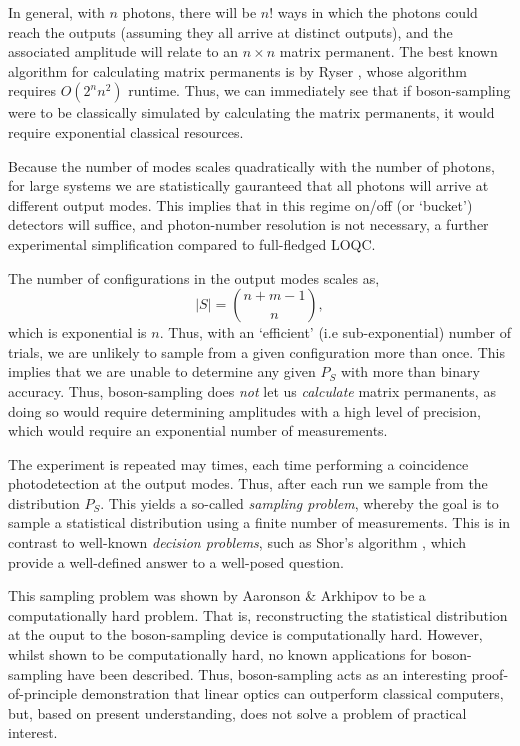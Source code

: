 \documentclass[aps,pra,twocolumn,amsmath,amssymb,nofootinbib,superscriptaddress]{revtex4}
\begin{document}
In general, with $n$ photons, there will be $n!$ ways in which the photons could reach the outputs (assuming they all arrive at distinct outputs), and the associated amplitude will relate to an \mbox{$n\times n$} matrix permanent. The best known algorithm for calculating matrix permanents is by Ryser \cite{bib:Ryser63}, whose algorithm requires \mbox{$O(2^n n^2)$} runtime. Thus, we can immediately see that if boson-sampling were to be classically simulated by calculating the matrix permanents, it would require exponential classical resources.

Because the number of modes scales quadratically with the number of photons, for large systems we are statistically gauranteed that all photons will arrive at different output modes. This implies that in this regime on/off (or `bucket') detectors will suffice, and photon-number resolution is not necessary, a further experimental simplification compared to full-fledged LOQC.

The number of configurations in the output modes scales as,
\begin{equation}
|S| = \binom{n+m-1}{n},
\end{equation}
which is exponential is $n$. Thus, with an `efficient' (i.e sub-exponential) number of trials, we are unlikely to sample from a given configuration more than once. This implies that we are unable to determine any given $P_S$ with more than binary accuracy. Thus, boson-sampling does \emph{not} let us \emph{calculate} matrix permanents, as doing so would require determining amplitudes with a high level of precision, which would require an exponential number of measurements.

The experiment is repeated may times, each time performing a coincidence photodetection at the output modes. Thus, after each run we sample from the distribution $P_S$. This yields a so-called \emph{sampling problem}, whereby the goal is to sample a statistical distribution using a finite number of measurements. This is in contrast to well-known \emph{decision problems}, such as Shor's algorithm \cite{bib:Shor97}, which provide a well-defined answer to a well-posed question.

This sampling problem was shown by Aaronson \& Arkhipov to be a computationally hard problem. That is, reconstructing the statistical distribution at the ouput to the boson-sampling device is computationally hard. However, whilst shown to be computationally hard, no known applications for boson-sampling have been described. Thus, boson-sampling acts as an interesting proof-of-principle demonstration that linear optics can outperform classical computers, but, based on present understanding, does not solve a problem of practical interest.
\end{document}
